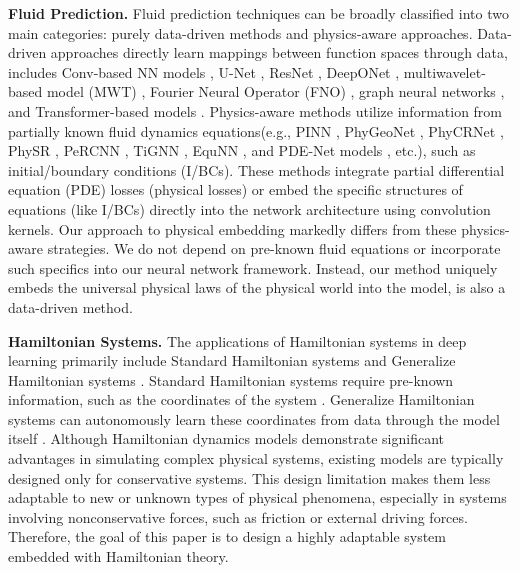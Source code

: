 \documentclass[sigconf]{acmart}
\begin{document}
\textbf{Fluid Prediction.} Fluid prediction techniques can be broadly classified into two main categories: purely data-driven methods and physics-aware approaches. Data-driven approaches directly learn mappings between function spaces through data, includes Conv-based NN models \cite{stachenfeld2021learned, bar2019learning}, U-Net \cite{gupta2022towards}, ResNet \cite{he2016deep}, DeepONet \cite{lu2021learning}, multiwavelet-based model (MWT) \cite{gupta2021multiwavelet}, Fourier Neural Operator (FNO) \cite{li2020fourier}, graph neural networks \cite{sanchez2020learning, pfaff2020learning}, and Transformer-based models \cite{janny2023eagle, li2024scalable, wu2024transolver}. Physics-aware methods utilize information from partially known fluid dynamics equations(e.g., PINN \cite{raissi2019physics, raissi2020hidden, wang2020towards, tang2023adversarial}, PhyGeoNet \cite{gao2021phygeonet}, PhyCRNet \cite{ren2022phycrnet}, PhySR \cite{ren2023physr}, PeRCNN \cite{rao2022discovering, rao2023encoding}, TiGNN \cite{hernandez2023thermodynamics}, EquNN \cite{wang2020incorporating}, and PDE-Net models \cite{long2018pde, long2019pde} , etc.), such as initial/boundary conditions (I/BCs). These methods integrate partial differential equation (PDE) losses (physical losses) or embed the specific structures of equations (like I/BCs) directly into the network architecture using convolution kernels. Our approach to physical embedding markedly differs from these physics-aware strategies. We do not depend on pre-known fluid equations or incorporate such specifics into our neural network framework. Instead, our method uniquely embeds the universal physical laws of the physical world into the model, is also a data-driven method.

\textbf{Hamiltonian Systems.} The applications of Hamiltonian systems in deep learning primarily include Standard Hamiltonian systems and Generalize Hamiltonian systems \cite{chen2022learning}. Standard Hamiltonian systems require pre-known information, such as the coordinates of the system \cite{howse1995gradient, seung1997minimax, raissi2019physics, greydanus2019hamiltonian, brockman2016openai}. Generalize Hamiltonian systems can autonomously learn these coordinates from data through the model itself \cite{howse1995gradient, course2020weak, lee2021machine, chen2021neural, sosanya2022dissipative}. Although Hamiltonian dynamics models demonstrate significant advantages in simulating complex physical systems, existing models are typically designed only for conservative systems. This design limitation makes them less adaptable to new or unknown types of physical phenomena, especially in systems involving nonconservative forces, such as friction or external driving forces. Therefore, the goal of this paper is to design a highly adaptable system embedded with Hamiltonian theory.
\end{document}

